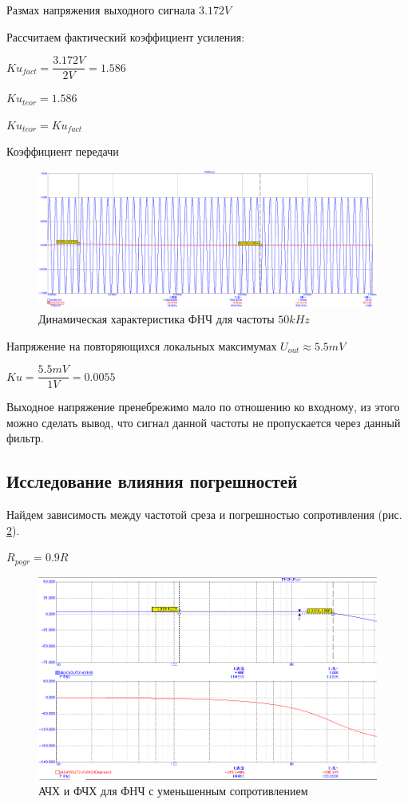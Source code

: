\documentclass[a4paper,14pt]{article}
\begin{document}
Размах напряжения выходного сигнала $3.172V$

Рассчитаем фактический коэффициент усиления:

$Ku_{fact} = \dfrac{3.172V}{2V} = 1.586$

$Ku_{teor} = 1.586$

$Ku_{teor} = Ku_{fact}$

Коэффициент передачи 

\begin{figure}[H]
	\centering
	\includegraphics[width=0.95\linewidth]{../imgs/FNCH/garm_50k_N}
	\caption{Динамическая характеристика ФНЧ для частоты $50kHz$}
	\label{fig:garm50kn}
\end{figure}

Напряжение на повторяющихся локальных максимумах $U_{out} \approx 5.5mV$

$Ku = \dfrac{5.5mV}{1V} = 0.0055$

Выходное напряжение пренебрежимо мало по отношению ко входному, из этого можно сделать вывод, что сигнал данной частоты не пропускается через данный фильтр.

\subsection{Исследование влияния погрешностей}

Найдем зависимость между частотой среза и погрешностью сопротивления (рис. \ref{fig:pogrrn}). 

$R_{pogr} = 0.9R$

\begin{figure}[H]
	\centering
	\includegraphics[width=0.85\linewidth]{../imgs/FNCH/pogr_R_N}
	\caption{АЧХ и ФЧХ для ФНЧ с уменьшенным сопротивлением}
	\label{fig:pogrrn}
\end{figure}
\end{document}
